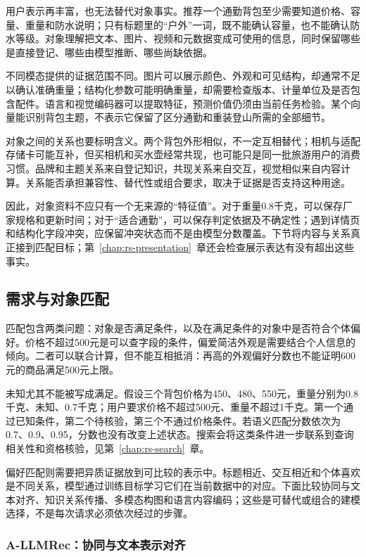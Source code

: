 用户表示再丰富，也无法替代对象事实。推荐一个通勤背包至少需要知道价格、容量、重量和防水说明；只有标题里的“户外”一词，既不能确认容量，也不能确认防水等级。对象理解把文本、图片、视频和元数据变成可使用的信息，同时保留哪些是直接登记、哪些由模型推断、哪些尚缺依据。

不同模态提供的证据范围不同。图片可以展示颜色、外观和可见结构，却通常不足以确认准确重量；结构化参数可能明确重量，却需要检查版本、计量单位及是否包含配件。语言和视觉编码器可以提取特征，预测价值仍须由当前任务检验。某个向量能识别背包主题，不表示它保留了区分通勤和重装登山所需的全部细节。

对象之间的关系也要标明含义。两个背包外形相似，不一定互相替代；相机与适配存储卡可能互补，但买相机和买水壶经常共现，也可能只是同一批旅游用户的消费习惯。品牌和主题关系来自登记知识，共现关系来自交互，视觉相似来自内容计算。关系能否承担兼容性、替代性或组合要求，取决于证据是否支持这种用途。

因此，对象资料不应只有一个无来源的“特征值”。对于重量0.8千克，可以保存厂家规格和更新时间；对于“适合通勤”，可以保存判定依据及不确定性；遇到详情页和结构化字段冲突，应保留冲突状态而不是由模型分数覆盖。下节将内容与关系真正接到匹配目标；第~\ref{chap:rs-presentation}~章还会检查展示表达有没有超出这些事实。

\subsection{需求与对象匹配}
\label{sec:rs-user-item-match}

匹配包含两类问题：对象是否满足条件，以及在满足条件的对象中是否符合个体偏好。价格不超过500元是可以查字段的条件，偏爱简洁外观是需要结合个人信息的倾向。二者可以联合计算，但不能互相抵消：再高的外观偏好分数也不能证明600元的商品满足500元上限。

未知尤其不能被写成满足。假设三个背包价格为450、480、550元，重量分别为0.8千克、未知、0.7千克；用户要求价格不超过500元、重量不超过1千克。第一个通过已知条件，第二个待核验，第三个不通过价格条件。若语义匹配分数依次为0.7、0.9、0.95，分数也没有改变上述状态。搜索会将这类条件进一步联系到查询相关性和资格核验，见第~\ref{chap:rs-search}~章。

偏好匹配则需要把异质证据放到可比较的表示中。标题相近、交互相近和个体喜欢是不同关系，模型通过训练目标学习它们在当前数据中的对应。下面比较协同与文本对齐、知识关系传播、多模态构图和语言内容编码；这些是可替代或组合的建模选择，不是每次请求必须依次经过的步骤。

\subsubsection{A-LLMRec：协同与文本表示对齐}
\label{sec:rs-a-llmrec}

